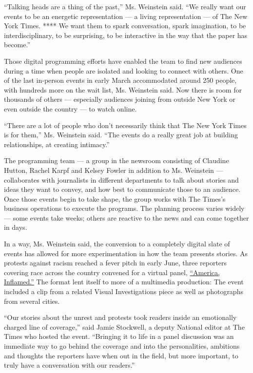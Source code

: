 ``Talking heads are a thing of the past,'' Ms. Weinstein said. ``We
really want our events to be an energetic representation --- a living
representation --- of The New York Times. **** We want them to spark
conversation, spark imagination, to be interdisciplinary, to be
surprising, to be interactive in the way that the paper has become.''

Those digital programming efforts have enabled the team to find new
audiences during a time when people are isolated and looking to connect
with others. One of the last in-person events in early March
accommodated around 250 people, with hundreds more on the wait list, Ms.
Weinstein said. Now there is room for thousands of others --- especially
audiences joining from outside New York or even outside the country ---
to watch online.

``There are a lot of people who don't necessarily think that The New
York Times is for them,'' Ms. Weinstein said. ``The events do a really
great job at building relationships, at creating intimacy.''

The programming team --- a group in the newsroom consisting of Claudine
Hutton, Rachel Karpf and Kelsey Fowler in addition to Ms. Weinstein ---
collaborates with journalists in different departments to talk about
stories and ideas they want to convey, and how best to communicate those
to an audience. Once those events begin to take shape, the group works
with The Times's business operations to execute the programs. The
planning process varies widely --- some events take weeks; others are
reactive to the news and can come together in days.

In a way, Ms. Weinstein said, the conversion to a completely digital
slate of events has allowed for more experimentation in how the team
presents stories. As protests against racism reached a fever pitch in
early June, three reporters covering race across the country convened
for a virtual panel,
\href{https://timesevents.nytimes.com/race}{``America, Inflamed.''} The
format lent itself to more of a multimedia production: The event
included a clip from a related Visual Investigations piece as well as
photographs from several cities.

``Our stories about the unrest and protests took readers inside an
emotionally charged line of coverage,'' said Jamie Stockwell, a deputy
National editor at The Times who hosted the event. ``Bringing it to life
in a panel discussion was an immediate way to go behind the coverage and
into the personalities, ambitions and thoughts the reporters have when
out in the field, but more important, to truly have a conversation with
our readers.''

